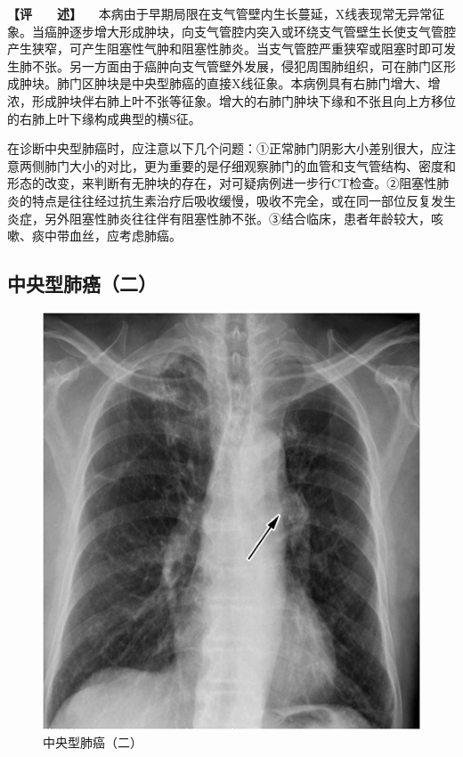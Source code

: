\textbf{【评　　述】}
　本病由于早期局限在支气管壁内生长蔓延，X线表现常无异常征象。当癌肿逐步增大形成肿块，向支气管腔内突入或环绕支气管壁生长使支气管腔产生狭窄，可产生阻塞性气肿和阻塞性肺炎。当支气管腔严重狭窄或阻塞时即可发生肺不张。另一方面由于癌肿向支气管壁外发展，侵犯周围肺组织，可在肺门区形成肿块。肺门区肿块是中央型肺癌的直接X线征象。本病例具有右肺门增大、增浓，形成肿块伴右肺上叶不张等征象。增大的右肺门肿块下缘和不张且向上方移位的右肺上叶下缘构成典型的横S征。

在诊断中央型肺癌时，应注意以下几个问题：①正常肺门阴影大小差别很大，应注意两侧肺门大小的对比，更为重要的是仔细观察肺门的血管和支气管结构、密度和形态的改变，来判断有无肿块的存在，对可疑病例进一步行CT检查。②阻塞性肺炎的特点是往往经过抗生素治疗后吸收缓慢，吸收不完全，或在同一部位反复发生炎症，另外阻塞性肺炎往往伴有阻塞性肺不张。③结合临床，患者年龄较大，咳嗽、痰中带血丝，应考虑肺癌。

\subsection{中央型肺癌（二）}

\begin{figure}[!htbp]
 \centering
 \includegraphics{./images/Image00164.jpg}
 \captionsetup{justification=centering}
 \caption{中央型肺癌（二）}
 \label{fig3-8-2}
  \end{figure} 

